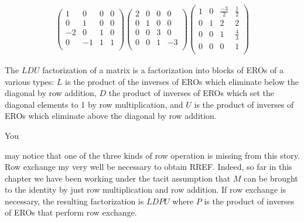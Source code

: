 \begin{example}
\begin{eqnarray*}
\begin{pmatrix}
1&0&0&0\\
0&1&0&0\\
-2&0&1&0\\
0&-1&1&1\\
\end{pmatrix} 
\begin{pmatrix}
2&0&0&0\\
0&1&0&0\\
0&0&3&0\\
0&0&1&-3\\
\end{pmatrix} 
\begin{pmatrix}
1&0&\frac{-3}{2}&\frac{1}{2}\\
0&1&2&2\\
0&0&1&\frac43\\
0&0&0&1\\
\end{pmatrix}
\end{eqnarray*}
\end{example}

The $LDU$ factorization of a matrix is a factorization into blocks of EROs of a various types: $L$ is the product of the inverses of EROs which eliminate below the diagonal by row addition, $D$ the product of inverses of EROs which set the diagonal elements to 1 by row multiplication, and $U$ is the product of inverses of EROs which eliminate above the diagonal by row addition.

\hypertarget{LDPU}{
You} may notice that one of the three kinds of row operation is missing from this story. 
Row exchange my very well be necessary to obtain RREF. Indeed, 
so far in this chapter we have been working under the tacit assumption that 
$M$ can be brought to the identity by just row multiplication and row addition. 
If row exchange is necessary, the resulting factorization is $LDPU$ where $P$ is the product of inverses of EROs that perform row exchange. 

